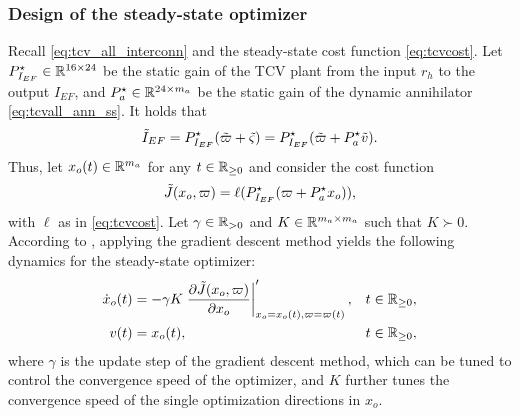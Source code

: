\subsubsection{Design of the steady-state optimizer}
\label{sec:tcvall_ssopt}
Recall \eqref{eq:tcv_all_interconn} and the steady-state cost function \eqref{eq:tcvcost}. Let $P^\star_{I_{EF}}\in\mathbb{R}^{16 \times 24}$ be the static gain of the TCV plant from the input $r_h$ to the output $I_{EF}$, and $P^\star_a\in\mathbb{R}^{24 \times m_a}$ be the static gain of the dynamic annihilator \eqref{eq:tcvall_ann_ss}. It holds that
\begin{equation}
  \label{eq:tcvall_ssef}
  \tilde{I}_{EF} = P^\star_{I_{EF}}(\tilde{\varpi} + \tilde{\varsigma}) = P^\star_{I_{EF}}(\tilde{\varpi} + P^\star_a \tilde{v}).
\end{equation}
Thus, let $x_o(t)\in\mathbb{R}^{m_a}$ for any $t\in\mathbb{R}_{\geq 0}$ and consider the cost function
\begin{equation}
  \label{eq:tcvall_sscost}
  \tilde{J}(x_o,\varpi) = \ell(P^\star_{I_{EF}}(\varpi + P^\star_a x_o)),
\end{equation}
with $\ell$ as in \eqref{eq:tcvcost}. Let $\gamma\in\mathbb{R}_{>0}$ and $K\in\mathbb{R}^{m_a\times m_a}$ such that $K\succ 0$. According to \cite{zaccarian_dynamic_2009,cristofaro_output_2014}, applying the gradient descent method \cite{khalil_nonlinear_2002} yields the following dynamics for the steady-state optimizer:
\begin{subequations}
  \label{eq:tcvall_ssopt}
  \begin{align}
    \dot{x}_o(t) &= -\gamma K \left.\frac{\partial\tilde{J}(x_o,\varpi)}{\partial x_o}\right|_{x_o = x_o(t),\varpi = \varpi(t)}', & t\in\mathbb{R}_{\geq 0},\\
    v(t) &= x_o(t), & t\in\mathbb{R}_{\geq 0},
  \end{align}
\end{subequations}
where $\gamma$ is the update step of the gradient descent method, which can be tuned to control the convergence speed of the optimizer, and $K$ further tunes the convergence speed of the single optimization directions in $x_o$.

